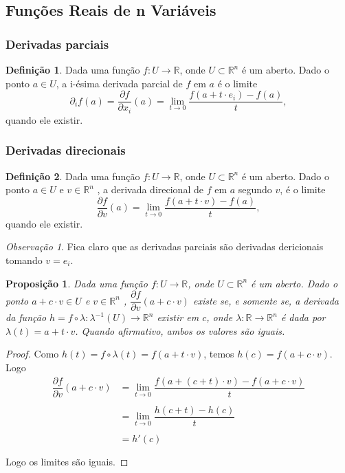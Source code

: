 \documentclass{article}
\newtheorem{prop}{Proposição}[section]
\theoremstyle{theorem}
\theoremstyle{lemma}
\theoremstyle{definition}
\newtheorem{definicao}{Definição}[section]
\theoremstyle{remark}
\newtheorem{obs}{Observação}[section]
\begin{document}
\subsection{ Funções Reais de n Variáveis}
   \subsubsection{Derivadas parciais}
   \begin{definicao}
	   Dada uma função \(f:U\to \mathbb{R}\), onde \(U\subset \mathbb{R}^n\) é um aberto. Dado o  ponto  \(a\in U\), a i-ésima derivada parcial de \(f\) em \(a\) é o limite \[\partial_i f(a) =  \dfrac{\partial f}{\partial x_i} (a) =   \lim_{t\to 0} \dfrac{f(a+t\cdot e_i) - f(a)}{t},\]
	   quando ele existir. 
   \end{definicao}
   \subsubsection{Derivadas direcionais}
   \begin{definicao}
	   Dada uma função \(f:U\to \mathbb{R}\), onde \(U\subset \mathbb{R}^n\) é um aberto. Dado o  ponto  \(a\in U\) e \( v\in \mathbb{R}^n\) , a derivada direcional de  \(f\) em \(a\) segundo \(v\),  é o limite \[ \dfrac{\partial f}{\partial v} (a) =   \lim_{t\to 0} \dfrac{f(a+t\cdot v) - f(a)}{t},\]
	   quando ele existir. 
   \end{definicao}
   \begin{obs}
	   Fica claro que as derivadas parciais são derivadas dericionais tomando \(v = e_i\).
   \end{obs}
   \begin{prop}
	   
	   Dada uma função \(f:U\to \mathbb{R}\), onde \(U\subset \mathbb{R}^n\) é um aberto. Dado o  ponto  \(a+c\cdot v\in U\) e \( v\in \mathbb{R}^n\) ,  \(\dfrac{\partial f}{\partial v}(a + c\cdot v)\) existe se, e somente se, a derivada da função \(h = f\circ \lambda : \lambda^{-1}( U) \to \mathbb{R}^n \) existir em \(c\), onde \(\lambda:\mathbb{R} \to \mathbb{R}^n \) é dada por \( \lambda(t) = a + t\cdot v \). Quando afirmativo, ambos os valores são iguais.
   \end{prop}
   \begin{proof}
	   Como \(h(t) = f\circ \lambda (t) = f(a+t\cdot v) \), temos \( h(c) = f(a + c\cdot v) \). Logo 
	   \begin{align*}
		   \dfrac{\partial f}{\partial v} (a + c\cdot v) &=   \lim_{t\to 0} \dfrac{f(a+(c+t) \cdot v) - f(a + c\cdot v)}{t}\\~\\
		   &= \lim_{t\to 0} \dfrac{h(c+ t) - h(c)}{t} \\~\\
		   &= h'(c) \\~\\
	   \end{align*}
	   Logo os limites são iguais. 
   \end{proof}
\end{document}

